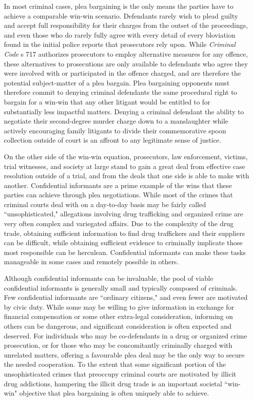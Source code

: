 In most criminal cases, plea bargaining is the only means the parties have to achieve a comparable win-win scenario. Defendants rarely wish to plead guilty and accept full responsibility for their charges from the outset of the proceedings, and even those who do rarely fully agree with every detail of every bloviation found in the initial police reports that prosecutors rely upon. While \textit{Criminal Code} s 717 authorizes prosecutors to employ alternative measures for any offence, these alternatives to prosecutions are only available to defendants who agree they were involved with or participated in the offence charged, and are therefore the potential subject-matter of a plea bargain. Plea bargaining opponents must therefore commit to denying criminal defendants the same procedural right to bargain for a win-win that any other litigant would be entitled to for substantially less impactful matters. Denying a criminal defendant the ability to negotiate their second-degree murder charge down to a manslaughter while actively encouraging family litigants to divide their commemorative spoon collection outside of court is an affront to any legitimate sense of justice.

On the other side of the win-win equation, prosecutors, law enforcement, victims, trial witnesses, and society at large stand to gain a great deal from effective case resolution outside of a trial, and from the deals that one side is able to make with another. Confidential informants are a prime example of the wins that these parties can achieve through plea negotiations. While most of the crimes that criminal courts deal with on a day-to-day basis may be fairly called ``unsophisticated," allegations involving drug trafficking and organized crime are very often complex and variegated affairs. Due to the complexity of the drug trade, obtaining sufficient information to find drug traffickers and their suppliers can be difficult, while obtaining sufficient evidence to criminally implicate those most responsible can be herculean. Confidential informants can make these tasks manageable in some cases and remotely possible in others.

Although confidential informants can be invaluable, the pool of viable confidential informants is generally small and typically composed of criminals. Few confidential informants are ``ordinary citizens," and even fewer are motivated by civic duty. While some may be willing to give information in exchange for financial compensation or some other extra-legal consideration, informing on others can be dangerous, and significant consideration is often expected and deserved. For individuals who may be co-defendants in a drug or organized crime prosecution, or for those who may be concomitantly criminally charged with unrelated matters, offering a favourable plea deal may be the only way to secure the needed cooperation. To the extent that some significant portion of the unsophisticated crimes that preoccupy criminal courts are motivated by illicit drug addictions, hampering the illicit drug trade is an important societal ``win-win" objective that plea bargaining is often uniquely able to achieve. 

